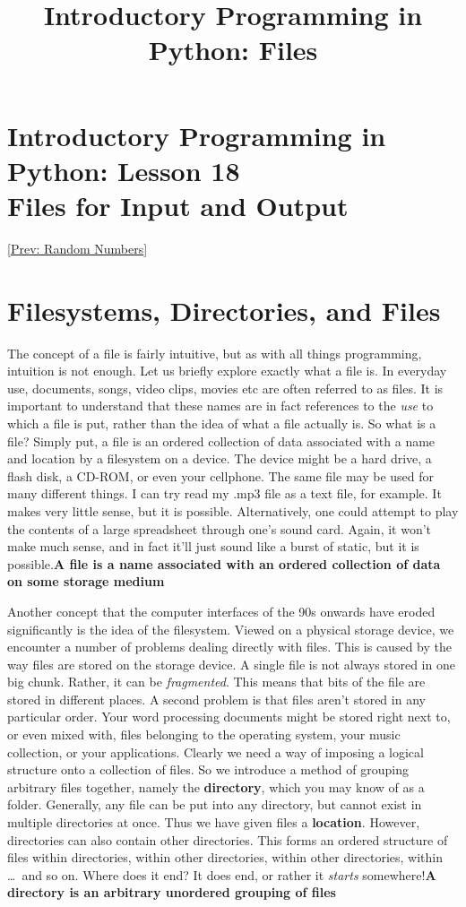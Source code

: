 \documentclass[a4paper,11pt]{article}
\title{Introductory Programming in Python: Files}
\begin{document}
\section{Introductory Programming in Python: Lesson 18
\\    Files for Input and Output}    [\href{random.html}{Prev: Random Numbers}]   

\section{Filesystems, Directories, and Files}

The concept of a file is fairly intuitive, but as with all things   programming, intuition is not enough. Let us briefly explore exactly   what a file is. In everyday use, documents, songs, video clips, movies etc are often referred to as files. It is   important to understand that these names are in fact references to the \textit{use} to which a   file is put, rather than the idea of what a file actually is. So what   is a file?  Simply put, a file is an ordered collection of data   associated with a name and location by a filesystem on a device. The device might be a hard drive, a flash disk, a CD-ROM, or   even your cellphone. The same file may be used for many different   things. I can try read my .mp3 file as a text file, for example. It makes very little   sense, but it is possible. Alternatively, one could attempt to play the   contents of a large spreadsheet through one's sound card. Again, it   won't make much sense, and in fact it'll just sound like a burst of static,   but it is possible.\textbf{A file is a name associated with an ordered collection of data on some storage medium}

Another concept that the computer interfaces of the 90s onwards have eroded   significantly is the idea of the filesystem.       Viewed on a physical storage device, we encounter a number of problems dealing directly with   files. This is caused by the way files are stored on the storage device. A single file is not always stored in one big chunk. Rather, it can be \textit{fragmented}. This means that bits of the file are stored in different places. A second problem is that files aren't stored in any particular order. Your word processing documents might be stored right next to, or even mixed with, files belonging to the operating system, your music   collection, or your applications. Clearly we need a way of imposing a   logical structure onto a collection of files. So we introduce a method   of grouping arbitrary files together, namely the   \textbf{directory}, which you may know of as a folder.   Generally, any file can be put into any directory, but cannot exist in   multiple directories at once. Thus we have given files a   \textbf{location}. However, directories can also contain other   directories. This forms an ordered structure of files within   directories, within other directories, within other directories, within \ldots\ and so on.      Where does   it end? It does end, or rather it \textit{starts} somewhere!\textbf{A directory is an arbitrary unordered grouping of files}
\end{document}
